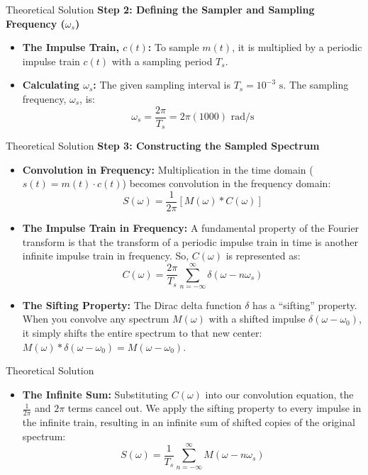 \documentclass{beamer}
\begin{document}
\begin{frame}{Theoretical Solution} 
\textbf{Step 2: Defining the Sampler and Sampling Frequency ($\omega_s$)}
\begin{itemize}
    \item \textbf{The Impulse Train, $c(t)$:} To sample $m(t)$, it is multiplied by a periodic impulse train $c(t)$ with a sampling period $T_s$.
    \item \textbf{Calculating $\omega_s$:} The given sampling interval is $T_s = 10^{-3} \text{ s}$. The sampling frequency, $\omega_s$, is:
    \[
    \omega_s = \frac{2\pi}{T_s} = 2\pi(1000) \text{ rad/s}
    \]
\end{itemize}
\end{frame}


\begin{frame}{Theoretical Solution} 
\textbf{Step 3: Constructing the Sampled Spectrum}
\begin{itemize}
    \item \textbf{Convolution in Frequency:} Multiplication in the time domain ($s(t) = m(t) \cdot c(t)$) becomes convolution in the frequency domain:
    \[
    S(\omega) = \frac{1}{2\pi} [M(\omega) * C(\omega)]
    \]
    \item \textbf{The Impulse Train in Frequency:} A fundamental property of the Fourier transform is that the transform of a periodic impulse train in time is another infinite impulse train in frequency. So, $C(\omega)$ is represented as:
    \[
    C(\omega) = \frac{2\pi}{T_s} \sum_{n=-\infty}^{\infty} \delta(\omega - n\omega_s)
    \]
    \item \textbf{The Sifting Property:} The Dirac delta function $\delta$ has a ``sifting'' property. When you convolve any spectrum $M(\omega)$ with a shifted impulse $\delta(\omega - \omega_0)$, it simply shifts the entire spectrum to that new center: $M(\omega) * \delta(\omega - \omega_0) = M(\omega - \omega_0)$.
    
\end{itemize}
\end{frame}

\begin{frame}{Theoretical Solution}
\begin{itemize}
\item \textbf{The Infinite Sum:} Substituting $C(\omega)$ into our convolution equation, the $\frac{1}{2\pi}$ and $2\pi$ terms cancel out. We apply the sifting property to every impulse in the infinite train, resulting in an infinite sum of shifted copies of the original spectrum:
    \[
    S(\omega) = \frac{1}{T_s} \sum_{n=-\infty}^{\infty} M(\omega - n\omega_s)
    \]
\end{itemize}
\end{frame}
\end{document}
